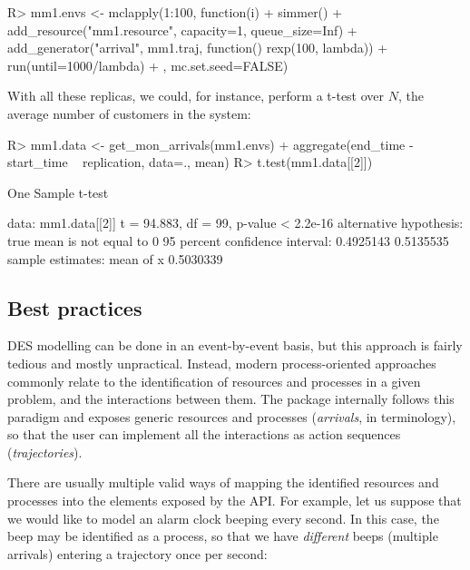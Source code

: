 \documentclass[
  nojss]{jss}
\begin{document}
\begin{CodeChunk}
\begin{CodeInput}
R> mm1.envs <- mclapply(1:100, function(i) {
+   simmer() %
+     add_resource("mm1.resource", capacity=1, queue_size=Inf) %
+     add_generator("arrival", mm1.traj, function() rexp(100, lambda)) %
+     run(until=1000/lambda) %
+ }, mc.set.seed=FALSE)
\end{CodeInput}
\end{CodeChunk}

With all these replicas, we could, for instance, perform a t-test over
\(N\), the average number of customers in the system:

\begin{CodeChunk}
\begin{CodeInput}
R> mm1.data <- get_mon_arrivals(mm1.envs) %
+   aggregate(end_time - start_time ~ replication, data=., mean)
R> t.test(mm1.data[[2]])
\end{CodeInput}
\begin{CodeOutput}

    One Sample t-test

data:  mm1.data[[2]]
t = 94.883, df = 99, p-value < 2.2e-16
alternative hypothesis: true mean is not equal to 0
95 percent confidence interval:
 0.4925143 0.5135535
sample estimates:
mean of x 
0.5030339 
\end{CodeOutput}
\end{CodeChunk}

\subsection{Best practices}\label{best-practices}

DES modelling can be done in an event-by-event basis, but this approach
is fairly tedious and mostly unpractical. Instead, modern
process-oriented approaches commonly relate to the identification of
resources and processes in a given problem, and the interactions between
them. The  package internally follows this paradigm and
exposes generic resources and processes (\emph{arrivals}, in
 terminology), so that the user can implement all the
interactions as action sequences (\emph{trajectories}).

There are usually multiple valid ways of mapping the identified
resources and processes into the elements exposed by the 
API. For example, let us suppose that we would like to model an alarm
clock beeping every second. In this case, the beep may be identified as
a process, so that we have \emph{different} beeps (multiple arrivals)
entering a  trajectory once per second:
\end{document}
